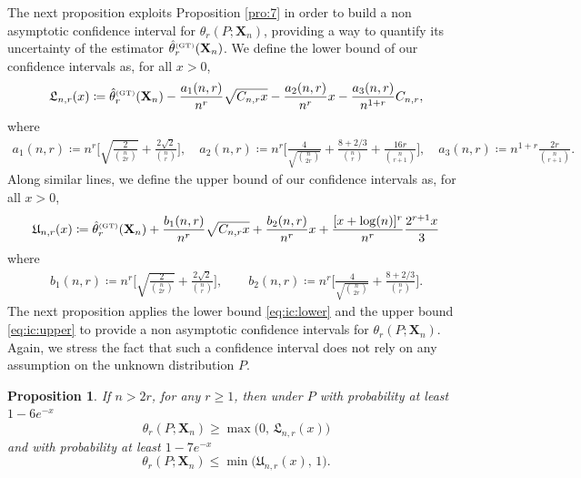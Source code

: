\documentclass{article}
\newtheorem{proposition}{Proposition}
\newcommand{\1}{\boldsymbol{1}}
\theoremstyle{plain}
\begin{document}
The next proposition exploits Proposition \ref{pro:7} in order to build a non asymptotic confidence interval for $\theta_r(P;\mathbf{X}_n)$, providing a way to quantify its uncertainty of the estimator $\hat{\theta}_{r}^{\text{\tiny{(GT)}}}(\mathbf{X}_{n})$. We define the lower bound of our confidence intervals as, for all $x > 0$,
\begin{equation}
  \label{eq:ic:lower}
  \mathfrak{L}_{n,r}(x)%
  \coloneqq%
  \hat{\theta}_{r}^{\text{\tiny{(GT)}}}(\mathbf{X}_{n})%
  - \frac{a_1(n,r)}{n^r} \sqrt{C_{n,r}x} - \frac{a_2(n,r)}{n^r} x - \frac{a_3(n,r)}{n^{1+r}} C_{n,r},
\end{equation}
where
\begin{gather*}
  a_1(n,r)%
  \coloneqq%
  n^r
  \Bigg[\sqrt{\frac{2}{\binom{n}{2r}}}%
  + \frac{2\sqrt{2}}{\binom{n}{r}}%
  \Bigg],\quad
  a_2(n,r)%
  \coloneqq%
  n^r\Bigg[ \frac{4}{\sqrt{\binom{n}{2r}}}%
  + \frac{8+2/3}{\binom{n}{r}}%
  + \frac{16 r }{\binom{n}{r+1}}%
  \Bigg],\quad
  a_3(n,r)%
  \coloneqq%
  n^{1+r}\frac{2r}{\binom{n}{r+1}}.
\end{gather*}
Along similar lines, we define the upper bound of our confidence intervals as, for all $x > 0$,
\begin{equation}
  \label{eq:ic:upper}
  \mathfrak{U}_{n,r}(x)%
  \coloneqq%
  \hat{\theta}_{r}^{\text{\tiny{(GT)}}}(\mathbf{X}_{n})%
    + \frac{b_1(n,r)}{n^r} \sqrt{C_{n,r}x} + \frac{b_2(n,r)}{n^r} x + \frac{[x+\log(n)]^r}{n^r} \frac{2^{r+1}x}{3}
  \end{equation}
where
\begin{gather*}
  b_1(n,r)%
  \coloneqq n^r\Bigg[ \sqrt{\frac{2}{\binom{n}{2r}}} + \frac{2 \sqrt{2}}{\binom{n}{r}} \Bigg],\qquad
  b_2(n,r)%
  \coloneqq n^r\Bigg[\frac{4}{\sqrt{\binom{n}{2r}}} + \frac{8 + 2/3}{\binom{n}{r}}%
  \Bigg].
\end{gather*}
The next proposition applies the lower bound \eqref{eq:ic:lower} and the upper bound \eqref{eq:ic:upper} to provide a non asymptotic confidence intervals for $\theta_r(P;\mathbf{X}_n)$. Again, we stress the fact that such a confidence interval does not rely on any assumption on the unknown distribution $P$.

\begin{proposition}
  \label{pro:7-confidence}
  If $n > 2r$, for any $r\geq1$, then under $P$ with probability at least $1 - 6e^{-x}$
  \begin{equation*}
    \theta_r(P;\mathbf{X}_n)%
    \geq \max\Big(0,\, \mathfrak{L}_{n,r}(x) \Big)
  \end{equation*}
  and with probability at least $1 - 7e^{-x}$
  \begin{equation*}
    \theta_r(P;\mathbf{X}_n)%
    \leq \min\Big(\mathfrak{U}_{n,r}(x),\, 1\Big).
  \end{equation*}
\end{proposition}
\end{document}
